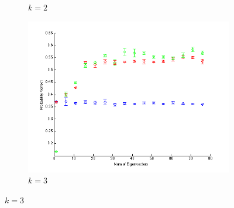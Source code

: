 \documentclass[12pt]{article}
\begin{document}
\begin{itemize}
\begin{figure}[h!]
\begin{subfigure}[b]{0.45\textwidth}
   \caption{$k=2$}
    \end{subfigure}
    \begin{subfigure}[b]{0.45\textwidth}
                \includegraphics[width=\textwidth]{figures/G2_k_3_all.png}
      \caption{$k=3$}
          \end{subfigure}


\end{figure}
\end{itemize}
\end{document}
